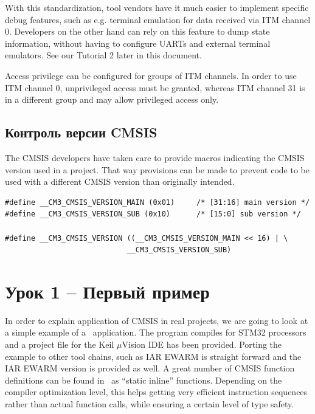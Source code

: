 With this standardization, tool vendors have it much easier to implement
specific debug features, such as e.g. terminal emulation for data received via
ITM channel 0. Developers on the other hand can rely on this feature to dump
state information, without having to configure UARTs and external terminal
emulators. See our Tutorial 2 later in this document.

Access privilege can be configured for groups of ITM channels. In order to use
ITM channel 0, unprivileged access must be granted, whereas ITM channel 31 is in
a different group and may allow privileged access only.

\subsection{Контроль версии CMSIS}

The CMSIS developers have taken care to provide macros indicating the CMSIS
version used in a project. That way provisions can be made to prevent code to be
used with a different CMSIS version than originally intended.


\begin{lstlisting}[style=cpp]
#define __CM3_CMSIS_VERSION_MAIN (0x01)		/* [31:16] main version */
#define __CM3_CMSIS_VERSION_SUB (0x10)		/* [15:0] sub version */

#define __CM3_CMSIS_VERSION ((__CM3_CMSIS_VERSION_MAIN << 16) | \
							__CM3_CMSIS_VERSION_SUB)
\end{lstlisting}

\section{Урок 1 – Первый пример}

In order to explain application of CMSIS in real projects, we are going to look
at a simple example of a \cm{3}\ application. The program compiles for STM32
processors and a project file for the Keil $\mu$Vision IDE has been provided.
Porting the example to other tool chains, such as IAR EWARM is straight forward
and the IAR EWARM version is provided as well. A great number of CMSIS function
definitions can be found in \file{core\_cm3.h}\ as “static inline” functions.
Depending on the compiler optimization level, this helps getting very efficient
instruction sequences rather than actual function calls, while ensuring a
certain level of type safety.

